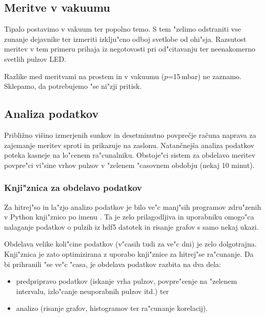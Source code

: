 \documentclass[12pt,a4paper]{article}
\begin{document}
\subsection{Meritve v vakuumu}
Tipalo postavimo v vakuum ter popolno temo. S tem "zelimo odstraniti vse zunanje dejavnike ter izmeriti izklju"cno odboj svetlobe od ohi"sja. Razsutost meritev v tem primeru prihaja iz negotovosti pri od"citavanju ter neenakomerno svetlih pulzov LED.

Razlike med meritvami na prostem in v vakuumu ($p$=15\,mbar) ne zaznamo. Sklepamo, da potrebujemo "se ni"zji pritisk.

\subsection{Analiza podatkov}

Približno višino izmerjenih sunkov in desetminutno povprečje računa naprava za zajemanje meritev sproti in prikazuje na zaslonu. 
Natančnejša analiza podatkov poteka kasneje na lo"cenem ra"cunalniku.  Obstoje"ci sistem za obdelavo meritev povpre"ci vi"sine vrhov pulzov v "zelenem "casovnem obdobju (nekaj 10 minut).


\subsubsection{Knji"znica za obdelavo podatkov}
Za hitrej"so in la"zjo analizo podatkov je bilo ve"c manj"sih programov zdru"zenih v Python knji"znico po imenu . Ta je zelo prilagodljiva in uporabniku omogo"ca nalaganje podatkov o pulzih iz hdf5 \cite{hdf5} datotek in risanje grafov s samo nekaj ukazi.

Obdelava velike koli"cine podatkov (v"casih tudi za ve"c dni) je zelo dolgotrajna. Knji"znica  je zato optimizirana z uporabo knji"znice  za hitrej"se ra"cunanje. Da bi prihranili "se ve"c "casa, je obdelava podatkov razbita na dva dela:
\begin{itemize}
	\item predpripravo podatkov (iskanje vrha pulzov, povpre"cenje na "zelenem intervalu, izlo"canje neuporabnih pulzov itd.) ter
	\item analizo (risanje grafov, histogramov ter ra"cunanje korelacij).
\end{itemize}
\end{document}
